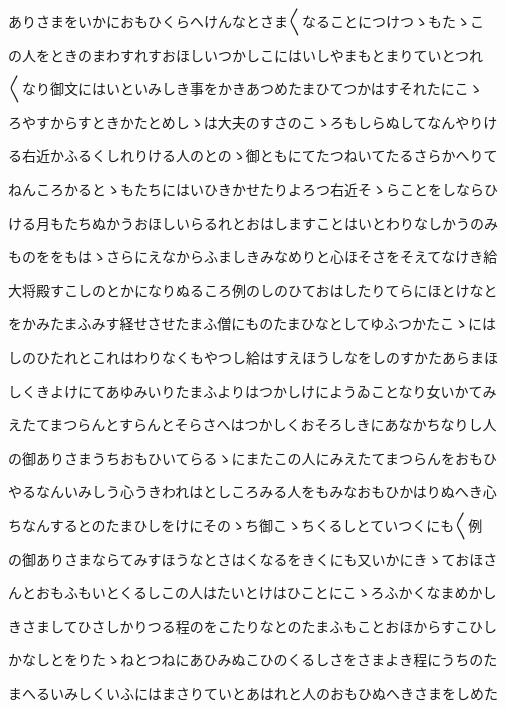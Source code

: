\documentclass[a4paper,11pt,landscape]{ltjtarticle}
\begin{document}
\par\medskip
ありさまをいかにおもひくらへけんなとさま〱なることにつけつゝもたゝこ
\par\medskip
の人をときのまわすれすおほしいつかしこにはいしやまもとまりていとつれ
\par\medskip
〱なり御文にはいといみしき事をかきあつめたまひてつかはすそれたにこゝ
\par\medskip
ろやすからすときかたとめしゝは大夫のすさのこゝろもしらぬしてなんやりけ
\par\medskip
る右近かふるくしれりける人のとのゝ御ともにてたつねいてたるさらかへりて
\par\medskip
ねんころかるとゝもたちにはいひきかせたりよろつ右近そゝらことをしならひ
\par\medskip
ける月もたちぬかうおほしいらるれとおはしますことはいとわりなしかうのみ
\par\medskip
ものををもはゝさらにえなからふましきみなめりと心ほそさをそえてなけき給
\par\medskip
大将殿すこしのとかになりぬるころ例のしのひておはしたりてらにほとけなと
\par\medskip
をかみたまふみす経せさせたまふ僧にものたまひなとしてゆふつかたこゝには
\par\medskip
しのひたれとこれはわりなくもやつし給はすえほうしなをしのすかたあらまほ
\par\medskip
しくきよけにてあゆみいりたまふよりはつかしけにようゐことなり女いかてみ
\par\medskip
えたてまつらんとすらんとそらさへはつかしくおそろしきにあなかちなりし人
\par\medskip
の御ありさまうちおもひいてらるゝにまたこの人にみえたてまつらんをおもひ
\par\medskip
やるなんいみしう心うきわれはとしころみる人をもみなおもひかはりぬへき心
\par\medskip
ちなんするとのたまひしをけにそのゝち御こゝちくるしとていつくにも〱例
\par\medskip
の御ありさまならてみすほうなとさはくなるをきくにも又いかにきゝておほさ
\par\medskip
んとおもふもいとくるしこの人はたいとけはひことにこゝろふかくなまめかし
\par\medskip
きさましてひさしかりつる程のをこたりなとのたまふもことおほからすこひし
\par\medskip
かなしとをりたゝねとつねにあひみぬこひのくるしさをさまよき程にうちのた
\par\medskip
まへるいみしくいふにはまさりていとあはれと人のおもひぬへきさまをしめた
\par\medskip
\end{document}
